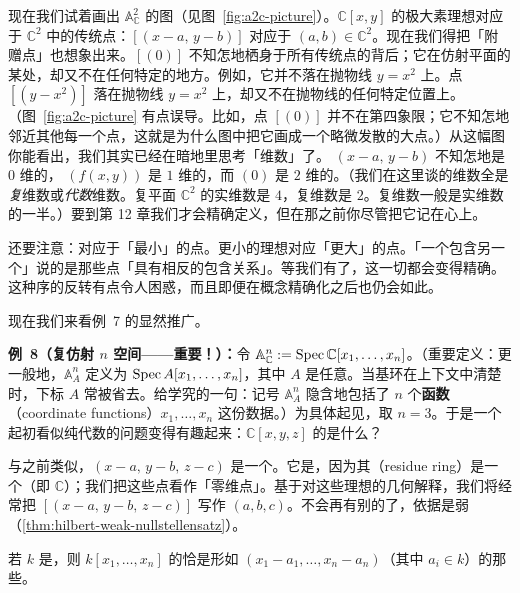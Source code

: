 现在我们试着画出 $\mathbb{A}^2_{\mathbb{C}}$ 的图（见图~\ref{fig:a2c-picture}）。$\mathbb{C}[x,y]$ 的极大素理想对应于 $\mathbb{C}^2$ 中的传统点：$[(x-a,\,y-b)]$ 对应于 $(a,b)\in\mathbb{C}^2$。现在我们得把「附赠点」也想象出来。$[(0)]$ 不知怎地栖身于所有传统点的背后；它在仿射平面的某处，却又不在任何特定的地方。例如，它并不落在抛物线 $y=x^2$ 上。点 $[(y-x^2)]$ 落在抛物线 $y=x^2$ 上，却又不在抛物线的任何特定位置上。（图~\ref{fig:a2c-picture} 有点误导。比如，点 $[(0)]$ 并不在第四象限；它不知怎地邻近其他每一个点，这就是为什么图中把它画成一个略微发散的大点。）从这幅图你能看出，我们其实已经在暗地里思考「维数」了。\trPrimeIdeal{} $(x-a,\,y-b)$ 不知怎地是 $0$ 维的，\trPrimeIdeal{} $(f(x,y))$ 是 $1$ 维的，而 $(0)$ 是 $2$ 维的。（我们在这里谈的维数全是\emph{复}维数或\emph{代数}维数。复平面 $\mathbb{C}^2$ 的实维数是 $4$，复维数是 $2$。复维数一般是实维数的一半。）要到第 12 章我们才会精确定义\trDimension，但在那之前你尽管把它记在心上。

还要注意：\trMaximalIdeal{}对应于「最小」的点。更小的理想对应「更大」的点。「一个\trPrimeIdeal{}包含另一个」说的是那些点「具有相反的包含关系」。等我们有了\trTopology，这一切都会变得精确。这种序的反转有点令人困惑，而且即便在概念精确化之后也仍会如此。

现在我们来看例~7 的显然推广。

\textbf{例~8（复仿射 $n$ 空间——重要！）：}令 $\mathbb{A}^n_{\mathbb{C}}:=\operatorname{Spec}\mathbb{C}[x_1,\dots,x_n]$。（重要定义：更一般地，$\mathbb{A}^n_A$ 定义为 $\operatorname{Spec} A[x_1,\dots,x_n]$，其中 $A$ 是任意\trRing。当基环在上下文中清楚时，下标 $A$ 常被省去。给学究的一句：记号 $\mathbb{A}^n_A$ 隐含地包括了 $n$ 个\textbf{\trCoordinate{}函数}（coordinate functions）$x_1,\dots,x_n$ 这份数据。）为具体起见，取 $n=3$。于是一个起初看似纯代数的问题变得有趣起来：$\mathbb{C}[x,y,z]$ 的\trPrimeIdeal{}是什么？

与之前类似，$(x-a,\,y-b,\,z-c)$ 是一个\trPrimeIdeal。它是\trMaximalIdeal，因为其\trResidueRing{}（residue ring）是一个\trField{}（即 $\mathbb{C}$）；我们把这些点看作「零维点」。基于对这些理想的几何解释，我们将经常把 $[(x-a,\,y-b,\,z-c)]$ 写作 $(a,b,c)$。不会再有别的\trMaximalIdeal{}了，依据是\trHilbert{}弱\trNullstellensatz（\cref{thm:hilbert-weak-nullstellensatz}）。

\begin{theorem}\label{thm:hilbert-weak-nullstellensatz}
若 $k$ 是\trAlgClosedField，则 $k[x_1,\dots,x_n]$ 的\trMaximalIdeal{}恰是形如 $(x_1-a_1,\dots,x_n-a_n)$（其中 $a_i\in k$）的那些\trIdeal。
\end{theorem}

